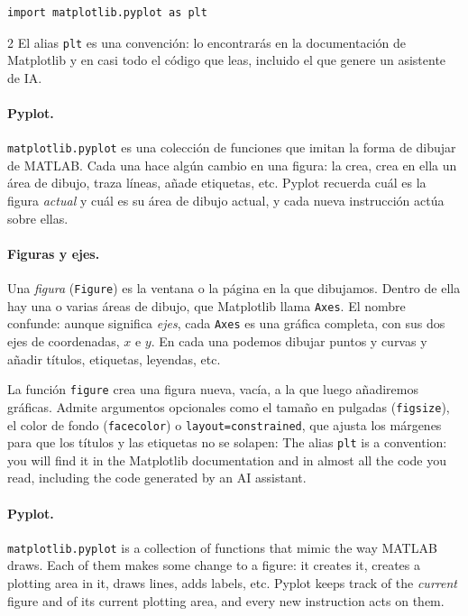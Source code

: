 \begin{verbatim}
import matplotlib.pyplot as plt
\end{verbatim}

\begin{paracol}{2}
El alias \texttt{plt} es una convención: lo encontrarás en la documentación de Matplotlib y en casi todo el código que leas, incluido el que genere un asistente de IA.

\paragraph{Pyplot.} \texttt{matplotlib.pyplot} es una colección de funciones que imitan la forma de dibujar de MATLAB. Cada una hace algún cambio en una figura: la crea, crea en ella un área de dibujo, traza líneas, añade etiquetas, etc. Pyplot recuerda cuál es la figura \emph{actual} y cuál es su área de dibujo actual, y cada nueva instrucción actúa sobre ellas.

\paragraph{Figuras y ejes.} Una \emph{figura} (\texttt{Figure}) es la ventana o la página en la que dibujamos. Dentro de ella hay una o varias áreas de dibujo, que Matplotlib llama \texttt{Axes}. El nombre confunde: aunque significa \emph{ejes}, cada \texttt{Axes} es una gráfica completa, con sus dos ejes de coordenadas, $x$ e $y$. En cada una podemos dibujar puntos y curvas y añadir títulos, etiquetas, leyendas, etc.

La función \texttt{figure} crea una figura nueva, vacía, a la que luego añadiremos gráficas. Admite argumentos opcionales como el tamaño en pulgadas (\texttt{figsize}), el color de fondo (\texttt{facecolor}) o \texttt{layout=\textquotesingle{}constrained\textquotesingle{}}, que ajusta los márgenes para que los títulos y las etiquetas no se solapen:
\switchcolumn
The alias \texttt{plt} is a convention: you will find it in the Matplotlib documentation and in almost all the code you read, including the code generated by an AI assistant.

\paragraph{Pyplot.} \texttt{matplotlib.pyplot} is a collection of functions that mimic the way MATLAB draws. Each of them makes some change to a figure: it creates it, creates a plotting area in it, draws lines, adds labels, etc. Pyplot keeps track of the \emph{current} figure and of its current plotting area, and every new instruction acts on them.


\end{paracol}
